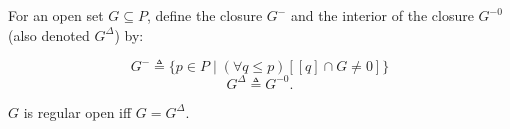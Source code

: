 For an open set $G \subseteq P$, define the closure $G^{-}$ and the interior of the closure $G^{-0}$ (also denoted $G^{\Delta}$) by:

$$G^{-} \triangleq \{p \in P \mid (\forall q \leq p)[[q] \cap G \neq 0]\}$$
$$G^{\Delta} \triangleq G^{-0}.$$

$G$ is regular open iff $G = G^{\Delta}$.
